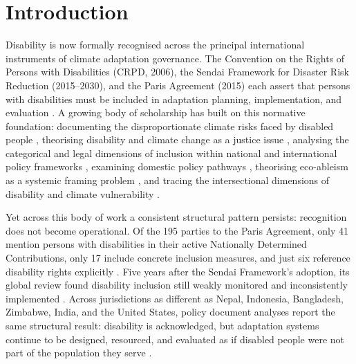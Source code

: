 \documentclass[12pt,a4paper]{article}
\begin{document}
\clearpage


\section*{Introduction}

Disability is now formally recognised across the principal international instruments of climate adaptation governance. The Convention on the Rights of Persons with Disabilities (CRPD, 2006), the Sendai Framework for Disaster Risk Reduction (2015--2030), and the Paris Agreement (2015) each assert that persons with disabilities must be included in adaptation planning, implementation, and evaluation \cite{UN_CRPD_2006,UNISDR_Sendai_Framework_2015,UN_Paris_Agreement_2015}. A growing body of scholarship has built on this normative foundation: documenting the disproportionate climate risks faced by disabled people \cite{gaskin2017factors,kosanic2022inclusive}, theorising disability and climate change as a justice issue \cite{stein2022disability,King2022}, analysing the categorical and legal dimensions of inclusion within national and international policy frameworks \cite{jodoin2025systematic,Jodoin2020,Harpur2025}, examining domestic policy pathways \cite{brown2025massachusetts,engelman2025california}, theorising eco-ableism as a systemic framing problem \cite{Harpur2025}, and tracing the intersectional dimensions of disability and climate vulnerability \cite{Murcott2025,Parker2025}.

Yet across this body of work a consistent structural pattern persists: recognition does not become operational. Of the 195 parties to the Paris Agreement, only 41 mention persons with disabilities in their active Nationally Determined Contributions, only 17 include concrete inclusion measures, and just six reference disability rights explicitly \cite{jodoin2025systematic}. Five years after the Sendai Framework's adoption, its global review found disability inclusion still weakly monitored and inconsistently implemented \cite{bennettgayle2020sendai}. Across jurisdictions as different as Nepal, Indonesia, Bangladesh, Zimbabwe, India, and the United States, policy document analyses report the same structural result: disability is acknowledged, but adaptation systems continue to be designed, resourced, and evaluated as if disabled people were not part of the population they serve \cite{devkota2023nepal,pertiwi2020indonesia,islam2015bangladesh,lunga2019zimbabwe,gershon2021fema}.
\end{document}
